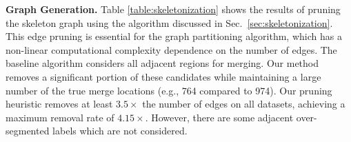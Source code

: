 \noindent\textbf{Graph Generation.}
Table \ref{table:skeletonization} shows the results of pruning the skeleton graph using the algorithm discussed in Sec.~\ref{sec:skeletonization}. 
This edge pruning is essential for the graph partitioning algorithm, which has a non-linear computational complexity dependence on the number of edges. 
The baseline algorithm considers all adjacent regions for merging. 
Our method removes a significant portion of these candidates while maintaining a large number of the true merge locations (e.g., 764 compared to 974). 
Our pruning heuristic removes at least $3.5\times$ the number of edges on all datasets, achieving a maximum removal rate of $4.15\times$.
However, there are some adjacent over-segmented labels which are not considered. 

\begin{table}
	\caption{The results of our graph pruning approach compared to the baseline graph with all adjacent regions. We show the number of true merge locations (e.g., 974) compared to total number of edges in the graph (e.g., 25,798) for each case. The number of missed splits corresponds to the number of split errors that our method misses compared to an adjacency matrix.}
	\centering
	\label{table:skeletonization}
\end{table}

